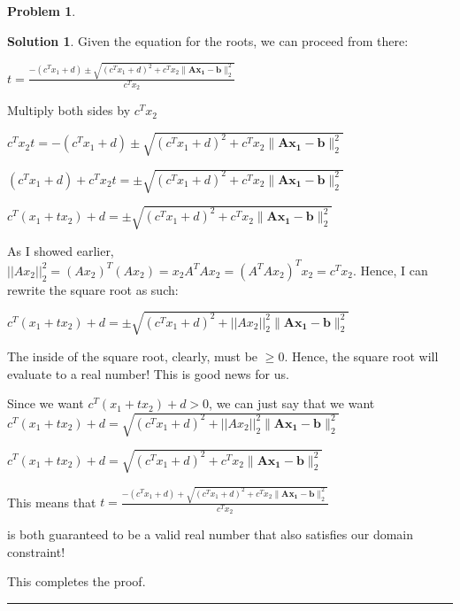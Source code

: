 \documentclass{article}
\theoremstyle{definition}
\newtheorem{problem}{Problem}
\def\fline{\rule{0.75\linewidth}{0.5pt}}
\newcommand{\finishline}{\begin{center}\fline\end{center}}
\newtheorem*{solution*}{Solution}
\newenvironment{solution}{\begin{solution*}}{{\finishline} \end{solution*}}
\begin{document}
\begin{problem}
\begin{enumerate}
\begin{solution}
        Given the equation for the roots, we can proceed from there: \newline 

        $t = \frac{-(c^Tx_1 + d) \pm \sqrt{(c^Tx_1 + d)^2 + c^Tx_2 \|\mathbf{Ax_1 - b}\|^2_2}}{c^Tx_2}$ \newline 

        Multiply both sides by $c^Tx_2$ \newline 

        $c^Tx_2 t = -(c^Tx_1 + d) \pm \sqrt{(c^Tx_1 + d)^2 + c^Tx_2 \|\mathbf{Ax_1 - b}\|^2_2}$ \newline 

        $(c^Tx_1 + d) + c^Tx_2 t = \pm \sqrt{(c^Tx_1 + d)^2 + c^Tx_2 \|\mathbf{Ax_1 - b}\|^2_2}$ \newline 

        $c^T(x_1 + tx_2) + d = \pm \sqrt{(c^Tx_1 + d)^2 + c^Tx_2 \|\mathbf{Ax_1 - b}\|^2_2}$

        As I showed earlier, $||Ax_2||^2_2 = (Ax_2)^T(Ax_2) = x_2A^TAx_2 = (A^TAx_2)^T x_2 = c^T x_2$. Hence, I can rewrite the square root as such: \newline 

        $c^T(x_1 + tx_2) + d = \pm \sqrt{(c^Tx_1 + d)^2 + ||Ax_2||^2_2 \|\mathbf{Ax_1 - b}\|^2_2}$

        The inside of the square root, clearly, must be $\geq 0$. Hence, the square root will evaluate to a real number! This is good news for us. 

        Since we want $c^T(x_1 + tx_2) + d > 0$, we can just say that we want  
        $c^T(x_1 + tx_2) + d =  \sqrt{(c^Tx_1 + d)^2 + ||Ax_2||^2_2 \|\mathbf{Ax_1 - b}\|^2_2}$ \newline 

        $c^T(x_1 + tx_2) + d =  \sqrt{(c^Tx_1 + d)^2 + c^Tx_2 \|\mathbf{Ax_1 - b}\|^2_2}$ \newline 


        This means that $t = \frac{-(c^Tx_1 + d) + \sqrt{(c^Tx_1 + d)^2 + c^Tx_2 \|\mathbf{Ax_1 - b}\|^2_2}}{c^Tx_2}$ 
        
        is both guaranteed to be a valid real number that also satisfies our domain constraint! 

        This completes the proof. 
        
        
    \end{solution}
\end{enumerate}
\end{problem}
\end{document}
